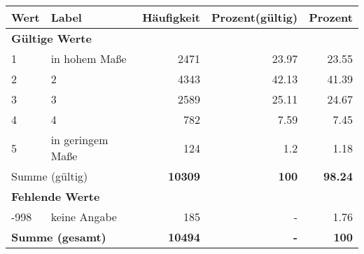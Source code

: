      \begin{longtable}{lXrrr}
     \toprule
     \textbf{Wert} & \textbf{Label} & \textbf{Häufigkeit} & \textbf{Prozent(gültig)} & \textbf{Prozent} \\
     \endhead
     \midrule
     \multicolumn{5}{l}{\textbf{Gültige Werte}}\\

     1 &
     \multicolumn{1}{X}{ in hohem Maße   } &


       \num{2471} &
       \num[round-mode=places,round-precision=2]{23,97} &
         \num[round-mode=places,round-precision=2]{23,55} \\

     2 &
     \multicolumn{1}{X}{ 2   } &


       \num{4343} &
       \num[round-mode=places,round-precision=2]{42,13} &
         \num[round-mode=places,round-precision=2]{41,39} \\

     3 &
     \multicolumn{1}{X}{ 3   } &


       \num{2589} &
       \num[round-mode=places,round-precision=2]{25,11} &
         \num[round-mode=places,round-precision=2]{24,67} \\

     4 &
     \multicolumn{1}{X}{ 4   } &


       \num{782} &
       \num[round-mode=places,round-precision=2]{7,59} &
         \num[round-mode=places,round-precision=2]{7,45} \\

     5 &
     \multicolumn{1}{X}{ in geringem Maße   } &


       \num{124} &
       \num[round-mode=places,round-precision=2]{1,2} &
         \num[round-mode=places,round-precision=2]{1,18} \\
     \midrule
     \multicolumn{2}{l}{Summe (gültig)} &
       \textbf{\num{10309}} &
     \textbf{100} &
       \textbf{\num[round-mode=places,round-precision=2]{98,24}} \\
     \multicolumn{5}{l}{\textbf{Fehlende Werte}}\\
       -998 &
       keine Angabe &
         \num{185} &
        - &
         \num[round-mode=places,round-precision=2]{1,76} \\
     \midrule
     \multicolumn{2}{l}{\textbf{Summe (gesamt)}} &
          \textbf{\num{10494}} &
        \textbf{-} &
        \textbf{100} \\
     \bottomrule
     \end{longtable}
     
